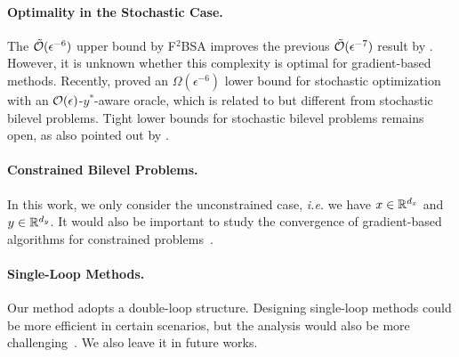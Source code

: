 \documentclass[twoside,11pt]{article}
\begin{document}
{\paragraph{Optimality in the Stochastic Case.} The $\tilde {{\mathcal{O}}}(\epsilon^{-6})$ upper bound by F${}^2$BSA improves the previous $\tilde {{\mathcal{O}}}(\epsilon^{-7})$ result by \citet{kwon2023fully}. However, it is unknown whether this complexity is optimal for gradient-based methods. Recently, \citet{kwoncomplexity} proved an $\Omega(\epsilon^{-6})$ lower bound for stochastic optimization with an ${\mathcal{O}}(\epsilon)$-$y^*$-aware oracle, which is related to but different from stochastic bilevel problems. Tight lower bounds for stochastic bilevel problems remains open, as also pointed out by \citet{kwoncomplexity}.
}



\paragraph{Constrained Bilevel Problems.} In this work, we only consider the unconstrained case, \textit{i.e.} we have $x \in {\mathbb{R}}^{d_x}$ and $y \in {\mathbb{R}}^{d_y}$. It would also be important to 
study the convergence of gradient-based algorithms for constrained problems~\citep{khanduri2023linearly,tsaknakis2022implicit,xiao2023alternating,kwon2024penalty,kornowski2024first}.

\paragraph{Single-Loop Methods.} 
Our method adopts a double-loop structure. Designing single-loop methods could be more efficient in certain scenarios, but the analysis would also be more challenging~\citep{hong2023two,khanduri2021near,chen2022single,chen2021closing,chen2023optimal,dagreou2022framework}. We also leave it in future works.
\end{document}
